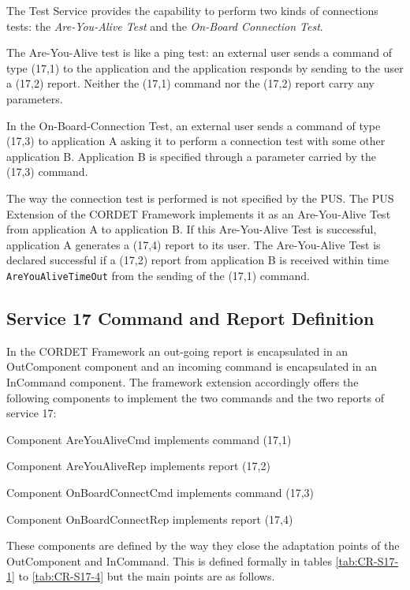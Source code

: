 \documentclass[a4paper,10pt]{article}
\newenvironment{fw_itemize}						%
{\begin{itemize}
  \setlength{\itemsep}{1mm}
  \setlength{\parskip}{0pt}
  \setlength{\parsep}{0pt}}
{\end{itemize}}
\begin{document}
The Test Service provides the capability to perform two kinds of connections tests: the \textit{Are-You-Alive Test} and the \textit{On-Board Connection Test}.

The Are-You-Alive test is like a ping test: an external user sends a command of type (17,1) to the application and the application responds by sending to the user a (17,2) report. Neither the (17,1) command nor the (17,2) report carry any parameters. 

In the On-Board-Connection Test, an external user sends a command of type (17,3) to application A asking it to perform a connection test with some other application B. Application B is specified through a parameter carried by the (17,3) command. 

The way the connection test is performed is not specified by the PUS. The PUS Extension of the CORDET Framework implements it as an Are-You-Alive Test from application A to application B. If this Are-You-Alive Test is successful, application A generates a (17,4) report to its user. The Are-You-Alive Test is declared successful if a (17,2) report from application B is received within time \texttt{AreYouAliveTimeOut} from the sending of the (17,1) command.

\subsection{Service 17 Command and Report Definition}
In the CORDET Framework an out-going report is encapsulated in an OutComponent component and an incoming command is encapsulated in an InCommand component. The framework extension accordingly offers the following components to implement the two commands and the two reports of service 17:

\begin{fw_itemize}
\item Component AreYouAliveCmd implements command (17,1) 
\item Component AreYouAliveRep implements report (17,2) 
\item Component OnBoardConnectCmd implements command (17,3)  
\item Component OnBoardConnectRep implements report (17,4) 
\end{fw_itemize}

These components are defined by the way they close the adaptation points of the OutComponent and InCommand. This is defined formally in tables \ref{tab:CR-S17-1} to \ref{tab:CR-S17-4} but the main points are as follows.
\end{document}
